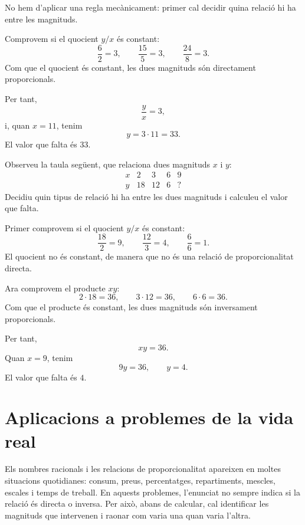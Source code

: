 \begin{solucio}
	No hem d'aplicar una regla mecànicament: primer cal decidir quina relació hi ha entre les magnituds.

	Comprovem si el quocient \(y/x\) és constant:
	\[
		\frac{6}{2}=3,
		\qquad
		\frac{15}{5}=3,
		\qquad
		\frac{24}{8}=3.
	\]
	Com que el quocient és constant, les dues magnituds són directament proporcionals.

	Per tant,
	\[
		\frac{y}{x}=3,
	\]
	i, quan \(x=11\), tenim
	\[
		y=3\cdot 11=33.
	\]
	El valor que falta és \(33\).
\end{solucio}

\begin{exercici}
	Observeu la taula següent, que relaciona dues magnituds \(x\) i \(y\):
	\[
	\begin{array}{c|cccc}
		x & 2 & 3 & 6 & 9 \\
		\hline
		y & 18 & 12 & 6 & ?
	\end{array}
	\]
	Decidiu quin tipus de relació hi ha entre les dues magnituds i calculeu el valor que falta.
\end{exercici}

\begin{solucio}
	Primer comprovem si el quocient \(y/x\) és constant:
	\[
		\frac{18}{2}=9,
		\qquad
		\frac{12}{3}=4,
		\qquad
		\frac{6}{6}=1.
	\]
	El quocient no és constant, de manera que no és una relació de proporcionalitat directa.

	Ara comprovem el producte \(xy\):
	\[
		2\cdot 18=36,
		\qquad
		3\cdot 12=36,
		\qquad
		6\cdot 6=36.
	\]
	Com que el producte és constant, les dues magnituds són inversament proporcionals.

	Per tant,
	\[
		xy=36.
	\]
	Quan \(x=9\), tenim
	\[
		9y=36,
		\qquad
		y=4.
	\]
	El valor que falta és \(4\).
\end{solucio}

\section{Aplicacions a problemes de la vida real}

Els nombres racionals i les relacions de proporcionalitat apareixen en moltes situacions quotidianes: consum, preus, percentatges, repartiments, mescles, escales i temps de treball. En aquests problemes, l'enunciat no sempre indica si la relació és directa o inversa. Per això, abans de calcular, cal identificar les magnituds que intervenen i raonar com varia una quan varia l'altra.

